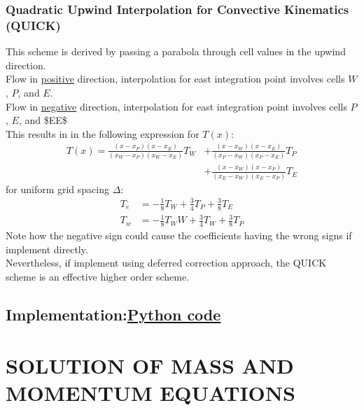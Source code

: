 \documentclass[11pt]{article}
\begin{document}
\subsubsection{Quadratic Upwind Interpolation for Convective Kinematics (QUICK)}
\label{sec:org7637321}
This scheme is derived by passing a parabola through cell values in the upwind direction. \\
Flow in \uline{positive} direction, interpolation for east integration point involves cells \(W\), \(P\), and \(E\).\\
Flow in \uline{negative} direction, interpolation for east integration point involves cells \(P\), \(E\), and \$EE\$\\
This results in in the following expression for \(T(x)\):
\begin{equation*}
\begin{aligned}
T(x) = \frac{(x-x_P)(x-x_E)}{(x_W-x_P)(x_W-x_E)}T_W &+ \frac{(x-x_W)(x-x_E)}{(x_P-x_W)(x_P-x_E)}T_P\\
&+\frac{(x-x_W)(x-x_P)}{(x_E-x_W)(x_E-x_P)}T_E
\end{aligned}
\end{equation*}
for uniform grid spacing \(\Delta\):
\begin{equation*}
\begin{aligned}
T_e &= -\frac{1}{8}T_W + \frac{3}{4}T_P + \frac{3}{8}T_E\\
T_w &= -\frac{1}{8}T_WW + \frac{3}{4}T_W + \frac{3}{8}T_P
\end{aligned}
\end{equation*}
Note how the negative sign could cause the coefficients having the wrong signs if implement directly.\\
Nevertheless, if implement using deferred correction approach, the QUICK scheme is an effective higher order scheme. 

\subsection{Implementation:\href{advection\_diffusion.py}{Python code}}
\label{sec:org6854827}

\clearpage
\section{SOLUTION OF MASS AND MOMENTUM EQUATIONS}
\label{sec:org702c612}
\end{document}

